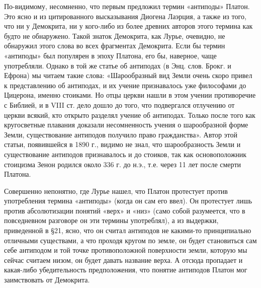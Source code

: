 По-видимому,  несомненно,  что   первым  предложил  термин  «антиподы»
Платон.  Это ясно  и  из цитированного  высказывания Диогена  Лаэрция,
а  также  из  того, что  ни  у  Демокрита,  ни  у кого-либо  из  более
древних авторов  этого термина как  будто не обнаружено.  Такой знаток
Демокрита,  как Лурье,  очевидно,  не обнаружил  этого  слова во  всех
фрагментах  Демокрита.  Если  бы  термин «антиподы»  был  популярен  в
эпоху Платона,  его бы,  наверное, чаще употребляли.  Однако в  той же
статье об  антиподах (в Энц.  слов. Брокг.  и Ефрона) мы  читаем такие
слова: «Шарообразный вид  Земли очень скоро привел  к представлению об
антиподах, и их учение признавалось уже философами до Цицерона, именно
стоиками. Но отцы церкви нашли в этом учении противоречие с Библией, и
в VIII  ст. дело дошло  до того,  что подвергался отлучению  от церкви
всякий, кто  открыто разделял учение  об антиподах. Только  после того
как кругосветные плавания доказали несомненность учения о шарообразной
форме  Земли,  существование  антиподов получило  право  гражданства».
Автор  этой  статьи,  появившейся  в  1890 г.,  видимо  не  знал,  что
шарообразность  Земли  и  существование антиподов  признавалось  и  до
стоиков, так как  основоположник стоицизма Зенон родился  около 336 г.
до н.э., т.е. через 11 лет после смерти Платона.

Совершенно непонятно,  где Лурье  нашел, что Платон  протестует против
употребления термина «антиподы» (когда он сам его ввел). Он протестует
лишь  против   абсолютизации  понятий  «верх»  и   «низ»  (само  собой
разумеется, что в повседневном разговоре он эти термины употреблял), а
из  выдержки, приведенной  в §21,  ясно,  что он  считал антиподов  не
какими-то  принципиально отличными  существами, а  что проходя  кругом
по  земле,  он  будет  становиться  сам себе  антиподом  и  той  точке
противоположной поверхности  земли, которую  мы сейчас  считаем низом,
он  будет  давать название  верха.  А  отсюда пропадает  и  какая-либо
убедительность  предположения,   что  понятие  антиподов   Платон  мог
заимствовать от Демокрита.

